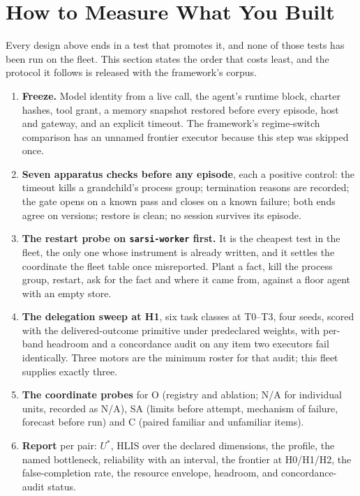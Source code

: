\section{How to Measure What You Built}\label{sec:measure}

Every design above ends in a test that promotes it, and none of those tests has been run on the fleet. This section states the order that costs least, and the protocol it follows is released with the framework's corpus.

\begin{enumerate}[leftmargin=*]
\item \textbf{Freeze.} Model identity from a live call, the agent's runtime block, charter hashes, tool grant, a memory snapshot restored before every episode, host and gateway, and an explicit timeout. The framework's regime-switch comparison has an unnamed frontier executor because this step was skipped once.
\item \textbf{Seven apparatus checks before any episode}, each a positive control: the timeout kills a grandchild's process group; termination reasons are recorded; the gate opens on a known pass and closes on a known failure; both ends agree on versions; restore is clean; no session survives its episode.
\item \textbf{The restart probe on \texttt{sarsi-worker} first.} It is the cheapest test in the fleet, the only one whose instrument is already written, and it settles the coordinate the fleet table once misreported. Plant a fact, kill the process group, restart, ask for the fact and where it came from, against a floor agent with an empty store.
\item \textbf{The delegation sweep at H1}, six task classes at T0--T3, four seeds, scored with the delivered-outcome primitive under predeclared weights, with per-band headroom and a concordance audit on any item two executors fail identically. Three motors are the minimum roster for that audit; this fleet supplies exactly three.
\item \textbf{The coordinate probes} for O (registry and ablation; N/A for individual units, recorded as N/A), SA (limits before attempt, mechanism of failure, forecast before run) and C (paired familiar and unfamiliar items).
\item \textbf{Report} per pair: $U^{*}$, HLIS over the declared dimensions, the profile, the named bottleneck, reliability with an interval, the frontier at H0/H1/H2, the false-completion rate, the resource envelope, headroom, and concordance-audit status.
\end{enumerate}

